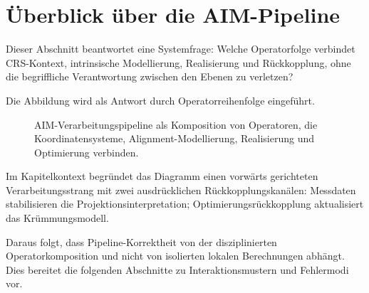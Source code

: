 \section{Überblick über die AIM-Pipeline}

Dieser Abschnitt beantwortet eine Systemfrage: Welche Operatorfolge verbindet
CRS-Kontext, intrinsische Modellierung, Realisierung und Rückkopplung, ohne die
begriffliche Verantwortung zwischen den Ebenen zu verletzen?

Die Abbildung wird als Antwort durch Operatorreihenfolge eingeführt.

\begin{figure}[ht]
\centering
{}
\caption{AIM-Verarbeitungspipeline als Komposition von Operatoren, die Koordinatensysteme, Alignment-Modellierung, Realisierung und Optimierung verbinden.}
\end{figure}

Im Kapitelkontext begründet das Diagramm einen vorwärts gerichteten
Verarbeitungsstrang mit zwei ausdrücklichen Rückkopplungskanälen: Messdaten
stabilisieren die Projektionsinterpretation; Optimierungsrückkopplung
aktualisiert das Krümmungsmodell.

Daraus folgt, dass Pipeline-Korrektheit von der disziplinierten
Operatorkomposition und nicht von isolierten lokalen Berechnungen abhängt. Dies
bereitet die folgenden Abschnitte zu Interaktionsmustern und Fehlermodi vor.
